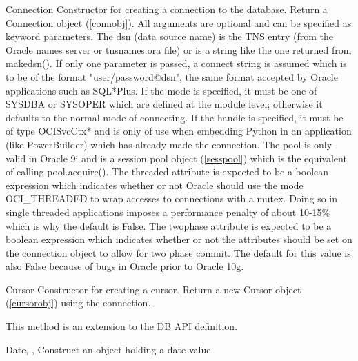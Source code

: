 \documentclass{manual}
\begin{document}
\begin{funcdesc}{Connection}{}
  Constructor for creating a connection to the database. Return a Connection
  object (\ref{connobj}). All arguments are optional and can be specified as
  keyword parameters. The dsn (data source name) is the TNS entry (from the
  Oracle names server or tnsnames.ora file) or is a string like the one
  returned from makedsn(). If only one parameter is passed, a connect string is
  assumed which is to be of the format "user/password@dsn", the same format
  accepted by Oracle applications such as SQL*Plus. If the mode is specified,
  it must be one of SYSDBA or SYSOPER which are defined at the module level;
  otherwise it defaults to the normal mode of connecting. If the handle is
  specified, it must be of type OCISvcCtx* and is only of use when embedding
  Python in an application (like PowerBuilder) which has already made the
  connection. The pool is only valid in Oracle 9i and is a session pool object
  (\ref{sesspool}) which is the equivalent of calling pool.acquire(). The
  threaded attribute is expected to be a boolean expression which indicates
  whether or not Oracle should use the mode OCI_THREADED to wrap accesses to
  connections with a mutex. Doing so in single threaded applications imposes
  a performance penalty of about 10-15\% which is why the default is False.
  The twophase attribute is expected to be a boolean expression which indicates
  whether or not the attributes should be set on the connection object to allow
  for two phase commit. The default for this value is also False because of
  bugs in Oracle prior to Oracle 10g.
\end{funcdesc}

\begin{funcdesc}{Cursor}{}
  Constructor for creating a cursor.  Return a new Cursor object
  (\ref{cursorobj}) using the connection.

   This method is an extension to the DB API definition.
\end{funcdesc}

\begin{funcdesc}{Date}{, , }
  Construct an object holding a date value.
\end{funcdesc}
\end{document}
